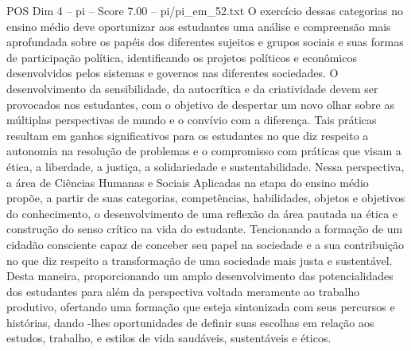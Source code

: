 \begin{textsample}{POS Dim 4 – pi – Score 7.00 – pi/pi\_em\_52.txt}
O exercício dessas categorias no ensino médio deve oportunizar aos estudantes uma análise e compreensão mais aprofundada sobre os papéis dos diferentes sujeitos e grupos sociais e suas formas de participação política, identificando os projetos políticos e econômicos desenvolvidos pelos sistemas e governos nas diferentes sociedades.
O desenvolvimento da sensibilidade, da autocrítica e da criatividade devem ser provocados nos estudantes, com o objetivo de despertar um novo olhar sobre as múltiplas perspectivas de mundo e o convívio com a diferença.
Tais práticas resultam em ganhos significativos para os estudantes no que diz respeito a autonomia na resolução de problemas e o compromisso com práticas que visam a ética, a liberdade, a justiça, a solidariedade e sustentabilidade.
Nessa perspectiva, a área de Ciências Humanas e Sociais Aplicadas na etapa do ensino médio propõe, a partir de suas categorias, competências, habilidades, objetos e objetivos do conhecimento, o desenvolvimento de uma reflexão da área pautada na ética e construção do senso crítico na vida do estudante.
Tencionando a formação de um cidadão consciente capaz de conceber seu papel na sociedade e a sua contribuição no que diz respeito a transformação de uma sociedade mais justa e sustentável.
Desta maneira, proporcionando um amplo desenvolvimento das potencialidades dos estudantes para além da perspectiva voltada meramente ao trabalho produtivo, ofertando uma formação que esteja sintonizada com seus percursos e histórias, dando -lhes oportunidades de definir suas escolhas em relação aos estudos, trabalho, e estilos de vida saudáveis, sustentáveis e éticos.

\end{textsample}
